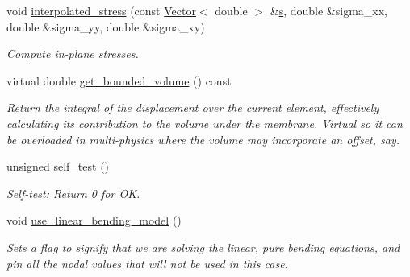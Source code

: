 \begin{DoxyCompactItemize}
void \hyperlink{classoomph_1_1FoepplvonKarmanEquations_ad5dae45475795bac40f5665391e1217e}{interpolated\+\_\+stress} (const \hyperlink{classoomph_1_1Vector}{Vector}$<$ double $>$ \&\hyperlink{cfortran_8h_ab7123126e4885ef647dd9c6e3807a21c}{s}, double \&sigma\+\_\+xx, double \&sigma\+\_\+yy, double \&sigma\+\_\+xy)
\begin{DoxyCompactList}\small\item\em Compute in-\/plane stresses. \end{DoxyCompactList}\item 
virtual double \hyperlink{classoomph_1_1FoepplvonKarmanEquations_a6fa390e13fa36ed3f4fe24bfe79af008}{get\+\_\+bounded\+\_\+volume} () const
\begin{DoxyCompactList}\small\item\em Return the integral of the displacement over the current element, effectively calculating its contribution to the volume under the membrane. Virtual so it can be overloaded in multi-\/physics where the volume may incorporate an offset, say. \end{DoxyCompactList}\item 
unsigned \hyperlink{classoomph_1_1FoepplvonKarmanEquations_a9aa68e9f999db1fe746f13a6b6a02b73}{self\+\_\+test} ()
\begin{DoxyCompactList}\small\item\em Self-\/test\+: Return 0 for OK. \end{DoxyCompactList}\item 
void \hyperlink{classoomph_1_1FoepplvonKarmanEquations_a64bc4611548789281d0fcdc4d306d14a}{use\+\_\+linear\+\_\+bending\+\_\+model} ()
\begin{DoxyCompactList}\small\item\em Sets a flag to signify that we are solving the linear, pure bending equations, and pin all the nodal values that will not be used in this case. \end{DoxyCompactList}\end{DoxyCompactItemize}
